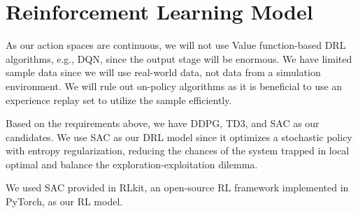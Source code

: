 \section{Reinforcement Learning Model}
As our action spaces are continuous, we will not use Value function-based DRL algorithms, e.g., DQN, since the output stage will be enormous. We have limited sample data since we will use real-world data, not data from a simulation environment. We will rule out on-policy algorithms as it is beneficial to use an experience replay set to utilize the sample efficiently.
\par
Based on the requirements above, we have DDPG, TD3, and SAC as our candidates. We use SAC as our DRL model since it optimizes a stochastic policy with entropy regularization, reducing the chances of the system trapped in local optimal and balance the exploration-exploitation dilemma.

We used SAC \cite{haarnoja2018soft} provided in RLkit, an open-source RL framework implemented in PyTorch\cite{pongrlkit}, as our RL model.
\
